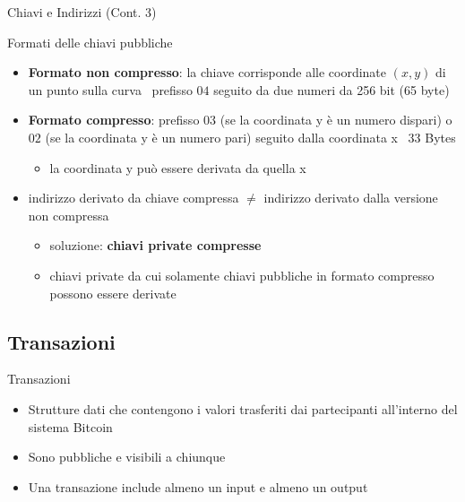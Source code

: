 \documentclass{beamer}
\begin{document}
  \begin{frame}{Chiavi e Indirizzi (Cont. 3)}
    \begin{block}{Formati delle chiavi pubbliche}
      \begin{itemize}
        \item \textbf{Formato non compresso}: la chiave corrisponde alle coordinate $(x,y)$ di un punto sulla curva \MVRightarrow\, prefisso $04$ seguito da due numeri da 256 bit (65 byte) \pause
        \item \textbf{Formato compresso}: prefisso $03$ (se la coordinata y è un numero dispari) o $02$ (se la coordinata y è un numero pari) seguito dalla coordinata x \MVRightarrow\, 33 Bytes
        \begin{itemize}
          \item la coordinata y può essere derivata da quella x \pause
        \end{itemize}
        \item indirizzo derivato da chiave compressa $\neq$ indirizzo derivato dalla versione non compressa \pause
        \begin{itemize}
          \item soluzione: \textbf{chiavi private compresse}
          \item chiavi private da cui solamente chiavi pubbliche in formato compresso possono essere derivate
        \end{itemize}
      \end{itemize}
    \end{block}
  \end{frame}




  \subsection{Transazioni}
  \begin{frame}{Transazioni}
    \begin{itemize}
      \item Strutture dati che contengono i valori trasferiti dai partecipanti all'interno del sistema Bitcoin
      \item Sono pubbliche e visibili a chiunque 
      \item Una transazione include almeno un input e almeno un output
    \end{itemize}
  \end{frame}
\end{document}
